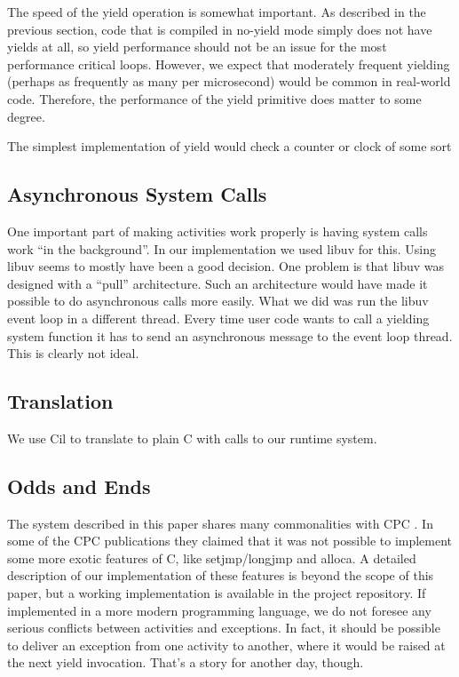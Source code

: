 \documentclass[10pt,preprint]{sigplanconf}
\begin{document}
The speed of the yield operation is somewhat important.
As described in the previous section, code that is compiled in no-yield mode simply does not have yields at all, so yield performance should not be an issue for the most performance critical loops.
However, we expect that moderately frequent yielding (perhaps as frequently as many per microsecond) would be common in real-world code.
Therefore, the performance of the yield primitive does matter to some degree.

The simplest implementation of yield would check a counter or clock of some sort

\subsection{Asynchronous System Calls}

One important part of making activities work properly is having system calls work ``in the background''.
In our implementation we used libuv for this.
Using libuv seems to mostly have been a good decision.
One problem is that libuv was designed with a ``pull'' architecture.
Such an architecture would have made it possible to do asynchronous calls more easily.
What we did was run the libuv event loop in a different thread.
Every time user code wants to call a yielding system function it has to send an asynchronous message to the event loop thread.
This is clearly not ideal.

\subsection{Translation}

We use Cil \cite{Necula2002} to translate \charcoal{} to plain C with calls to our runtime system.

\subsection{Odds and Ends}

The system described in this paper shares many commonalities with CPC \cite{Kerneis2013}.
In some of the CPC publications they claimed that it was not possible to implement some more exotic features of C, like setjmp/longjmp and alloca.
A detailed description of our implementation of these features is beyond the scope of this paper, but a working implementation is available in the project repository.
If implemented in a more modern programming language, we do not foresee any serious conflicts between activities and exceptions.
In fact, it should be possible to deliver an exception from one activity to another, where it would be raised at the next yield invocation.
That's a story for another day, though.
\end{document}
